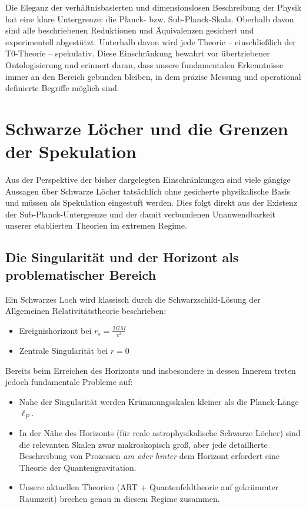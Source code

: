 Die Eleganz der verhältnisbasierten und dimensionslosen Beschreibung der Physik hat eine klare Untergrenze: die Planck- bzw. Sub-Planck-Skala. Oberhalb davon sind alle beschriebenen Reduktionen und Äquivalenzen gesichert und experimentell abgestützt. Unterhalb davon wird jede Theorie – einschließlich der T0-Theorie – spekulativ. Diese Einschränkung bewahrt vor übertriebener Ontologisierung und erinnert daran, dass unsere fundamentalen Erkenntnisse immer an den Bereich gebunden bleiben, in dem präzise Messung und operational definierte Begriffe möglich sind.
\section{Schwarze Löcher und die Grenzen der Spekulation}

Aus der Perspektive der bisher dargelegten Einschränkungen sind viele gängige Aussagen über Schwarze Löcher tatsächlich ohne gesicherte physikalische Basis und müssen als Spekulation eingestuft werden. Dies folgt direkt aus der Existenz der Sub-Planck-Untergrenze und der damit verbundenen Unanwendbarkeit unserer etablierten Theorien im extremen Regime.

\subsection{Die Singularität und der Horizont als problematischer Bereich}

Ein Schwarzes Loch wird klassisch durch die Schwarzschild-Lösung der Allgemeinen Relativitätstheorie beschrieben:
\begin{itemize}
	\item Ereignishorizont bei \(r_s = \frac{2GM}{c^2}\)
	\item Zentrale Singularität bei \(r = 0\)
\end{itemize}

Bereits beim Erreichen des Horizonts und insbesondere in dessen Innerem treten jedoch fundamentale Probleme auf:
\begin{itemize}
	\item Nahe der Singularität werden Krümmungsskalen kleiner als die Planck-Länge \(\ell_P\).
	\item In der Nähe des Horizonts (für reale astrophysikalische Schwarze Löcher) sind die relevanten Skalen zwar makroskopisch groß, aber jede detaillierte Beschreibung von Prozessen \emph{am oder hinter} dem Horizont erfordert eine Theorie der Quantengravitation.
	\item Unsere aktuellen Theorien (ART + Quantenfeldtheorie auf gekrümmter Raumzeit) brechen genau in diesem Regime zusammen.
\end{itemize}

